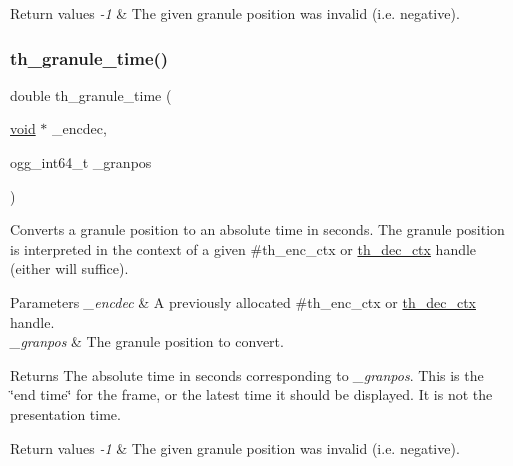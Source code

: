 \begin{DoxyRetVals}{Return values}
{\em -\/1} & The given granule position was invalid (i.\+e. negative). \\
\hline
\end{DoxyRetVals}
\mbox{\label{group__basefuncs_ga707e1e281de788af0df39ef00f3fb432}} 
\subsubsection{\texorpdfstring{th\+\_\+granule\+\_\+time()}{th\_granule\_time()}}
{\footnotesize\ttfamily double th\+\_\+granule\+\_\+time (\begin{DoxyParamCaption}\item[{\hyperlink{png_8h_ac9c84fa68bbad002983e35ce3663c686}{void} $\ast$}]{\+\_\+encdec,  }\item[{ogg\+\_\+int64\+\_\+t}]{\+\_\+granpos }\end{DoxyParamCaption})}

Converts a granule position to an absolute time in seconds. The granule position is interpreted in the context of a given \#th\+\_\+enc\+\_\+ctx or \hyperlink{theoradec_8h_a843d70bb02563885a8d54b9c1a781729}{th\+\_\+dec\+\_\+ctx} handle (either will suffice). 
\begin{DoxyParams}{Parameters}
{\em \+\_\+encdec} & A previously allocated \#th\+\_\+enc\+\_\+ctx or \hyperlink{theoradec_8h_a843d70bb02563885a8d54b9c1a781729}{th\+\_\+dec\+\_\+ctx} handle. \\
\hline
{\em \+\_\+granpos} & The granule position to convert. \\
\hline
\end{DoxyParams}
\begin{DoxyReturn}{Returns}
The absolute time in seconds corresponding to {\itshape \+\_\+granpos}. This is the \char`\"{}end time\char`\"{} for the frame, or the latest time it should be displayed. It is not the presentation time. 
\end{DoxyReturn}

\begin{DoxyRetVals}{Return values}
{\em -\/1} & The given granule position was invalid (i.\+e. negative). \\
\hline
\end{DoxyRetVals}
\mbox{\label{group__basefuncs_gab3d6441ab4a4969859ef5fd78a9e3c1c}} 
